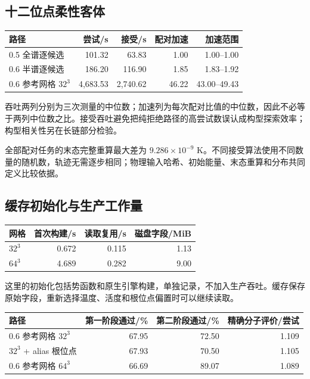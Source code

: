 \subsection{十二位点柔性客体}

\begin{center}\small
\begin{tabular}{@{}lrrrr@{}}\toprule
路径 & 尝试/s & 接受/s & 配对加速 & 加速范围\\\midrule
0.5 全谱逐候选 & 101.32 & 63.83 & 1.00 & 1.00--1.00\\
0.6 半谱逐候选 & 186.20 & 116.90 & 1.85 & 1.83--1.92\\
0.6 参考网格 $32^3$ & 4,683.53 & 2,740.62 & 46.22 & 43.00--49.43\\
\bottomrule\end{tabular}\end{center}

吞吐两列分别为三次测量的中位数；加速列为每次配对比值的中位数，因此不必等于两列中位数之比。接受吞吐避免把纯拒绝路径的高尝试数误认成构型探索效率；构型相关性另在长链部分检验。

全部配对任务的末态完整重算最大差为 $9.286\times10^{-9}$ K。不同接受算法使用不同数量的随机数，轨迹无需逐步相同；物理输入哈希、初始能量、末态重算和分布共同定义比较依据。

\subsection{缓存初始化与生产工作量}

\begin{center}\small
\begin{tabular}{@{}lrrr@{}}\toprule
网格 & 首次构建/s & 读取复用/s & 磁盘字段/MiB\\\midrule
$32^3$ & 0.672 & 0.115 & 1.13\\
$64^3$ & 4.689 & 0.282 & 9.00\\
\bottomrule\end{tabular}\end{center}

这里的初始化包括势函数和原生引擎构建，单独记录，不加入生产吞吐。缓存保存原始字段，重新选择温度、活度和根位点偏置时可以继续读取。

\begin{center}\small
\begin{tabular}{@{}lrrr@{}}\toprule
路径 & 第一阶段通过/\% & 第二阶段通过/\% & 精确分子评价/尝试\\\midrule
0.6 参考网格 $32^3$ & 67.95 & 72.50 & 1.109\\
$32^3$ + alias 根位点 & 67.93 & 70.50 & 1.105\\
0.6 参考网格 $64^3$ & 66.69 & 89.07 & 1.089\\
\bottomrule\end{tabular}\end{center}

